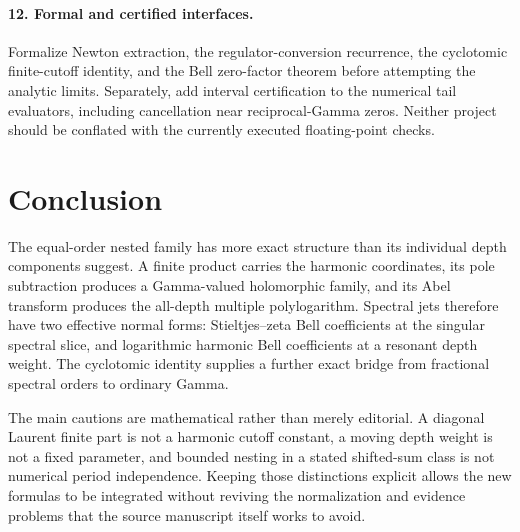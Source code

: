\documentclass[11pt]{article}
\numberwithin{equation}{section}
\theoremstyle{definition}\newtheorem{definition}[theorem]{Definition}
\theoremstyle{remark}\newtheorem{remark}[theorem]{Remark}
\begin{document}
\paragraph{12. Formal and certified interfaces.}
Formalize Newton extraction, the regulator-conversion recurrence, the
cyclotomic finite-cutoff identity, and the Bell zero-factor theorem before
attempting the analytic limits. Separately, add interval certification to
the numerical tail evaluators, including cancellation near reciprocal-Gamma
zeros. Neither project should be conflated with the currently executed
floating-point checks.

\section*{Conclusion}
The equal-order nested family has more exact structure than its individual
depth components suggest. A finite product carries the harmonic coordinates,
its pole subtraction produces a Gamma-valued holomorphic family, and its
Abel transform produces the all-depth multiple polylogarithm. Spectral
jets therefore have two effective normal forms: Stieltjes--zeta Bell
coefficients at the singular spectral slice, and logarithmic harmonic Bell
coefficients at a resonant depth weight. The cyclotomic identity supplies a
further exact bridge from fractional spectral orders to ordinary Gamma.

The main cautions are mathematical rather than merely editorial. A diagonal
Laurent finite part is not a harmonic cutoff constant, a moving depth weight
is not a fixed parameter, and bounded nesting in a stated shifted-sum class
is not numerical period independence. Keeping those distinctions explicit
allows the new formulas to be integrated without reviving the normalization
and evidence problems that the source manuscript itself works to avoid.
\end{document}
